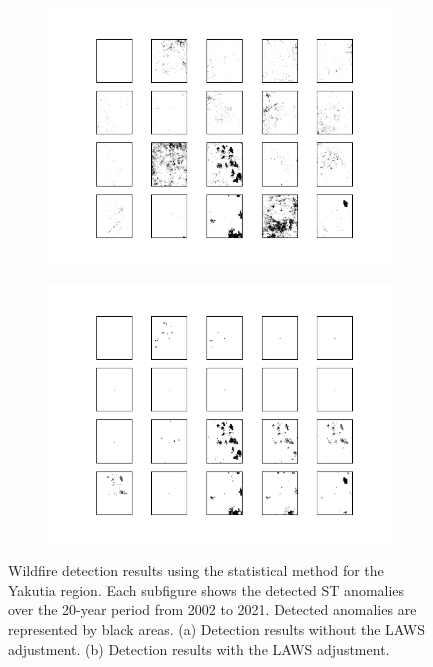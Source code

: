 \documentclass[11pt]{article}
\begin{document}
\begin{figure}[H]
     \centering
     
      \begin{subfigure}[b]{0.45\textwidth}
		\centering
		\includegraphics[width=\textwidth]{../figure/statistical_method_no_laws}
		\caption{}
	 \end{subfigure}
         \hfill
      \begin{subfigure}[b]{0.45\textwidth}
         \includegraphics[width=\textwidth]{../figure/statistical_method_laws}
         \caption{}
     \end{subfigure}
         \caption{Wildfire detection results using the statistical method for the Yakutia region. Each subfigure shows the detected ST anomalies over the 20-year period from 2002 to 2021. Detected anomalies are represented by black areas. (a) Detection results without the LAWS adjustment. (b) Detection results with the LAWS adjustment.}
      \label{fig: statistical_method_real_data}
\end{figure}
\end{document}
